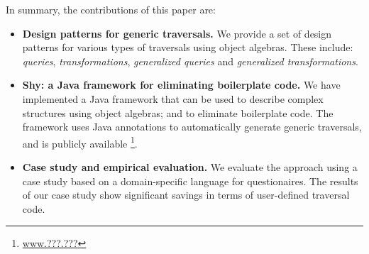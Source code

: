 In summary, the contributions of this paper are:

\begin{itemize}

\item {\bf Design patterns for generic traversals.} We provide a set of design 
patterns for various types of traversals using object algebras. These include: 
\emph{queries}, \emph{transformations},
\emph{generalized queries} and \emph{generalized transformations}.

\item {\bf Shy: a Java framework for eliminating boilerplate code.} We have implemented 
a Java framework that can be used to describe complex structures using 
object algebras; and to eliminate boilerplate code. The framework uses Java 
annotations to automatically generate generic traversals, and is publicly available
\footnote{\url{www.???.???}}.

\item {\bf Case study and empirical evaluation.} We evaluate the approach using 
a case study based on a domain-specific language for questionaires. The results 
of our case study show significant savings in terms of user-defined traversal code.

\end{itemize}
